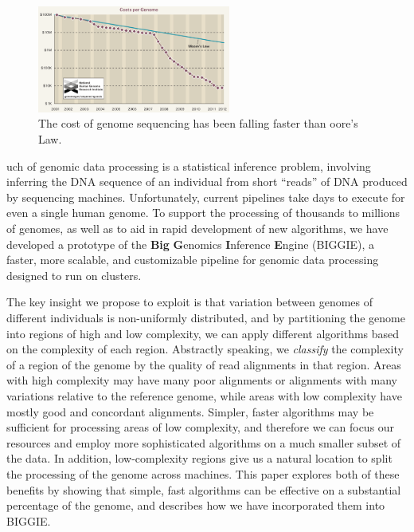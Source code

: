 \documentclass[10pt]{article}
\newcommand\TODO[1]{\textcolor{red}{TODO: #1}}
\begin{document}
\begin{figure}[h!]
  \centering
  \includegraphics[width=2.5in]{figs/sequencing-costs.png}
  \caption{The cost of genome sequencing has been falling faster than oore's Law.}
  \label{moore}
\end{figure}

uch of genomic data processing is a statistical inference problem, involving
inferring the DNA sequence of an individual from short ``reads'' of DNA produced
by sequencing machines. Unfortunately, current pipelines take days to execute
for even a single human genome.
To support the processing of thousands to millions of genomes, as well as to
aid in rapid development of new algorithms, we have developed a prototype of the {\bf Big} {\bf G}enomics {\bf I}nference
{\bf E}ngine (BIGGIE), a faster, more scalable, and customizable pipeline for
genomic data processing designed to run on clusters.  

The key insight we propose to exploit is that variation between
genomes of different individuals is non-uniformly distributed, and by
partitioning the genome into regions of high and low complexity, we can apply
different algorithms based on the complexity of each region.
Abstractly speaking, we \emph{classify} the complexity of a region of the genome
by the quality of read alignments in that region.  Areas with high complexity may
have many poor alignments or alignments with many variations relative to the
reference genome, while areas with low complexity have mostly good and
concordant alignments.
Simpler, faster algorithms may be sufficient for processing areas of low
complexity, and therefore we can focus our resources and employ more
sophisticated algorithms on a
much smaller subset of the data. In addition, low-complexity regions give us a
natural location to split the processing of the genome across machines.
This paper explores both of these benefits by showing that simple, fast algorithms
can be effective on a substantial percentage of the genome, and describes how we have 
incorporated them into BIGGIE.
\end{document}
